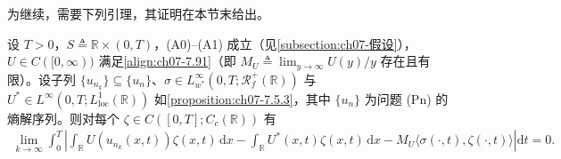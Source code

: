 \documentclass[../../main.tex]{subfiles}%
\begin{document}
为继续，需要下列引理，其证明在本节末给出。

\begin{lemma}\label{lemma:ch07-7.5.4}
设 $T>0$，$S\triangleq\mathbb{R}\times(0,T)$，(A0)--(A1) 成立（见\cref{subsection:ch07-假设}），$U\in C([0,\infty))$ 满足\eqref{align:ch07-7.91}（即 $M_U\triangleq\lim_{y\to\infty}U(y)/y$ 存在且有限）。设子列 $\{u_{n_k}\}\subseteq\{u_n\}$、$\sigma\in L^\infty_{w^*}(0,T;\mathscr{R}_f^+(\mathbb{R}))$ 与 $U^*\in L^\infty(0,T;L^1_{\mathrm{loc}}(\mathbb{R}))$ 如\cref{proposition:ch07-7.5.3}，其中 $\{u_n\}$ 为问题 (Pn) 的熵解序列。则对每个 $\zeta\in C([0,T];C_c(\mathbb{R}))$ 有
\begin{align}
\lim_{k\to\infty}\int_0^T\left|\int_{\mathbb{R}}U(u_{n_k}(x,t))\zeta(x,t)\,\mathrm{d}x
-\int_{\mathbb{R}}U^*(x,t)\zeta(x,t)\,\mathrm{d}x
-M_U\langle\sigma(\cdot,t),\zeta(\cdot,t)\rangle\right|\mathrm{d}t=0. \label{align:ch07-7.105}
\end{align}
\end{lemma}
\end{document}
